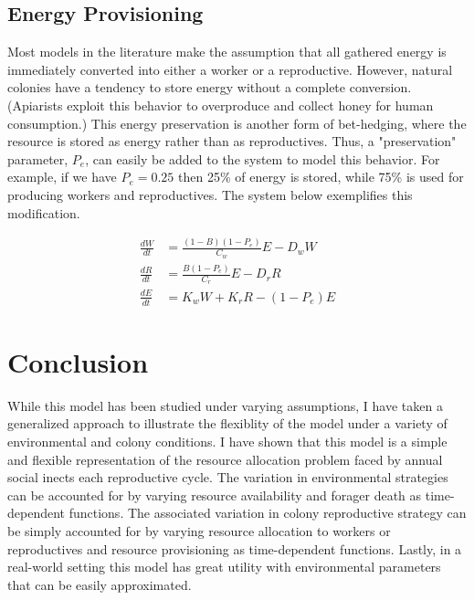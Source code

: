 \documentclass[12pt]{report}
\begin{document}
\section*{Energy Provisioning}
Most models in the literature make the assumption that all gathered energy is immediately converted into either a worker or a reproductive. However, natural colonies have a tendency to store energy without a complete conversion. (Apiarists exploit this behavior to overproduce and collect honey for human consumption.) This energy preservation is another form of bet-hedging, where the resource is stored as energy rather than as reproductives. Thus, a "preservation" parameter, $P_e$, can easily be added to the system to model this behavior. For example, if we have $P_e=0.25$ then 25\% of energy is stored, while 75\% is used for producing workers and reproductives. The system below exemplifies this modification.

\begin{equation}
\begin{aligned}
\frac{dW}{dt}&=\frac{(1-B)(1-P_e)}{C_w}E-D_w W\\
\frac{dR}{dt}&=\frac{B(1-P_e)}{C_r}E-D_r R\\
\frac{dE}{dt}&=K_w W + K_r R - (1-P_e)E
\end{aligned}
\label{eq: energy system}
\end{equation}


\chapter*{Conclusion}
While this model has been studied under varying assumptions, I have taken a generalized approach to illustrate the flexiblity of the model under a variety of environmental and colony conditions. I have shown that this model is a simple and flexible representation of the resource allocation problem faced by annual social inects each reproductive cycle. 
The variation in environmental strategies can be accounted for by varying resource availability and forager death as time-dependent functions. The associated variation in colony reproductive strategy can be simply accounted for by varying resource allocation to workers or reproductives and resource provisioning as time-dependent functions. Lastly, in a real-world setting this model has great utility with environmental parameters that can be easily approximated. 
\end{document}
